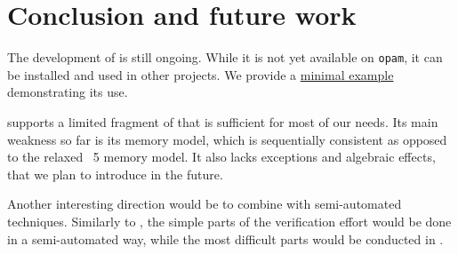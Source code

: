 \section{Conclusion and future work}

The development of \Zoo is still ongoing.
While it is not yet available on \texttt{opam}, it can be installed and used in other \Coq projects.
We provide a \href{https://github.com/clef-men/zoo_demo}{minimal example} demonstrating its use.

\Zoo supports a limited fragment of \OCaml that is sufficient for most of our needs.
Its main weakness so far is its memory model, which is sequentially consistent as opposed to the relaxed \OCaml~5 memory model.
It also lacks exceptions and algebraic effects, that we plan to introduce in the future.

Another interesting direction would be to combine \Zoo with semi-automated techniques.
Similarly to \WhyThree, the simple parts of the verification effort would be done in a semi-automated way, while the most difficult parts would be conducted in \Coq.

